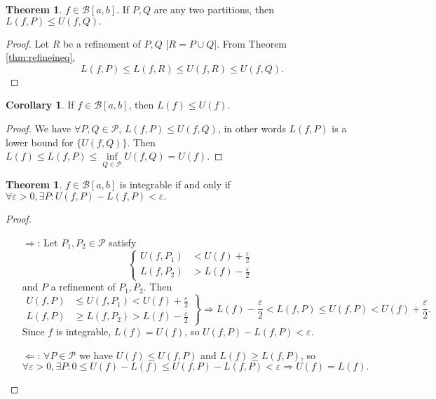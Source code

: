 \documentclass[a4paper]{article}
\theoremstyle{definition}
\newtheorem{thm}[defn]{Theorem}
\newtheorem{coro}[defn]{Corollary}
\begin{document}
\begin{thm}
	$f\in \mathcal B [a,b]$. If $P,Q$ are any two partitions, then $L(f,P) \leq U(f,Q) .$
\end{thm}

\begin{proof}
	Let $R$ be a refinement of $P,Q$ [$R=P\cup Q$]. From Theorem \ref{thm:refineineq},
\[
L(f,P)\leq L(f,R)\leq U(f,R)\leq U(f,Q) .
\]
\end{proof}

\begin{coro}
	If $f\in \mathcal B [a,b]$, then $L(f)\leq U(f)$.
\end{coro}

\begin{proof}
	We have $\forall P,Q \in \mathcal P$, $L(f,P) \leq U(f,Q)$, in other words $L(f,P)$ is a lower bound for $\{U(f,Q)\}$. Then $L(f) \leq L(f,P) \leq \underset{Q\in \mathcal P}{\inf} U(f,Q)=U(f) .$
\end{proof}

\begin{thm}
\label{thm:integrableineq}
	$f\in \mathcal B [a,b]$ is integrable if and only if $\forall \varepsilon >0, \exists P : U(f,P)-L(f,P)<\varepsilon .$
\end{thm}

\begin{proof}
	\begin{itemize}
		\item[$\Rightarrow$:] Let $P_1,P_2 \in \mathcal P$ satisfy
\[
\left\{\begin{aligned}
			U(f,P_1) &< U(f)+\frac{\varepsilon}2 \\ L(f,P_2) &> L(f)-\frac{\varepsilon}2
		\end{aligned} \right.
\]
and $P$ a refinement of $P_1,P_2$. Then
\[
\left.\begin{aligned}
			U(f,P)&\leq U(f,P_1)<U(f)+\frac{\varepsilon}{2} \\ L(f,P)&\geq L(f,P_2)>L(f)-\frac{\varepsilon}2
		\end{aligned} \right\} \Rightarrow L(f)-\frac{\varepsilon}2 < L(f,P) \leq U(f,P) < U(f)+\frac{\varepsilon}2 .
\]
Since $f$ is integrable, $L(f)=U(f)$, so $U(f,P)-L(f,P) < \varepsilon .$
		\item[$\Leftarrow$:] $\forall P \in \mathcal P$ we have $U(f) \leq U(f,P)$ and $L(f) \geq L(f,P)$, so
\[
\forall \varepsilon >0, \exists P : 0\leq U(f)-L(f) \leq U(f,P)-L(f,P) < \varepsilon \Rightarrow U(f)=L(f) .
\]
	\end{itemize}
\end{proof}
\end{document}
